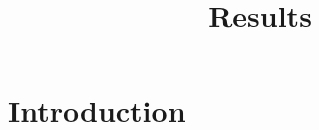 \documentclass{article}
\title{Results}
\begin{document}
\maketitle

\section{Introduction}








\end{document}
